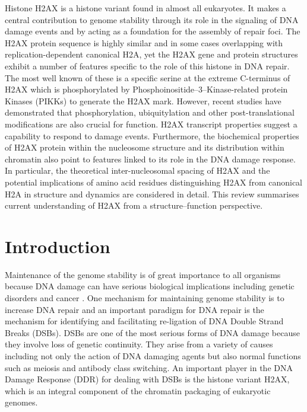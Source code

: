 \begin{chapterabstract}
  Histone H2AX is a histone variant found in almost all eukaryotes. It
  makes a central contribution to genome stability through its role in
  the signaling of DNA damage events and by acting as a foundation for
  the assembly of repair foci. The H2AX protein sequence is highly
  similar and in some cases overlapping with replication-dependent
  canonical H2A, yet the H2AX gene and protein structures exhibit a
  number of features specific to the role of this histone in DNA
  repair.  The most well known of these is a specific serine at the
  extreme C-terminus of H2AX which is phosphorylated by
  Phosphoinositide--3--Kinase-related protein Kinases (PIKKs) to
  generate the \textgamma H2AX mark. However, recent studies have
  demonstrated that phosphorylation, ubiquitylation and other
  post-translational modifications are also crucial for function. H2AX
  transcript properties suggest a capability to respond to damage
  events. Furthermore, the biochemical properties of H2AX protein
  within the nucleosome structure and its distribution within
  chromatin also point to features linked to its role in the DNA
  damage response. In particular, the theoretical inter-nucleosomal
  spacing of H2AX and the potential implications of amino acid
  residues distinguishing H2AX from canonical H2A in structure and
  dynamics are considered in detail. This review summarises current
  understanding of H2AX from a structure--function perspective.
\end{chapterabstract}

\section{Introduction}

Maintenance of the genome stability is of great importance to all
organisms because DNA damage can have serious biological implications
including genetic disorders and cancer \citep{PJM07}. One mechanism
for maintaining genome stability is to increase DNA repair
\citep{CLKWK98} and an important paradigm for DNA repair is the
mechanism for identifying and facilitating re-ligation of DNA Double
Strand Breaks (DSBs). DSBs are one of the most serious forms of DNA
damage because they involve loss of genetic continuity. They arise
from a variety of causes including not only the action of DNA damaging
agents but also normal functions such as meiosis and antibody class
switching. An important player in the DNA Damage Response (DDR) for
dealing with DSBs is the histone variant H2AX, which is an integral
component of the chromatin packaging of eukaryotic genomes.

